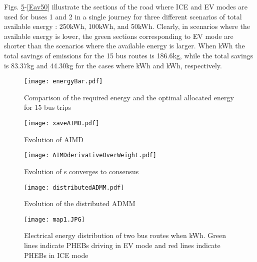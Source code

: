 \documentclass[journal]{IEEEtran}
\begin{document}
Figs. \ref{Eav250}-\ref{Eav50} illustrate the sections of the road where ICE and EV modes are used for buses 1 and 2 in a single journey for three different scenarios of total available energy : 250kWh, 100kWh, and 50kWh. Clearly, in scenarios where the available energy is lower, the green sections corresponding to EV mode are shorter than the scenarios where the available energy is larger. When kWh the total savings of  emissions for the 15 bus routes is 186.6kg, while the total savings is 83.37kg and 44.30kg for the cases where kWh and kWh, respectively. 

\begin{figure}[htbp]
	\begin{center}
		\hspace{-0.1cm}
		{\texttt{[image: energyBar.pdf]}}
		\caption{Comparison of the required energy and the optimal allocated energy for 15 bus trips}
		\label{total_energy}
	\end{center}
\end{figure}

\begin{figure}[htbp]
	\begin{center}
		{\texttt{[image: xaveAIMD.pdf]}}
		\caption{Evolution of AIMD}
		\label{AIMD1}
	\end{center}
\end{figure}


\begin{figure}[htbp]
	\begin{center}
		\hspace{-1cm}
		{\texttt{[image: AIMDderivativeOverWeight.pdf]}}
		\caption{Evolution of s converges to consensus}
		\label{AIMD2}
	\end{center}
\end{figure}


\begin{figure}[htbp]
	\begin{center}
		\hspace{-1cm}
		{\texttt{[image: distributedADMM.pdf]}}
		\caption{Evolution of the distributed ADMM}
		\label{ADMMresults}
	\end{center}
\end{figure}


\begin{figure}[htbp]
	\begin{center}
		{\texttt{[image: map1.JPG]}}
		\hspace{0.2cm}
		\caption{Electrical energy distribution of two bus routes when kWh. Green lines indicate PHEBs driving in EV mode and red lines indicate PHEBs in ICE mode}
		\label{Eav250}
	\end{center}
\end{figure}
\end{document}
